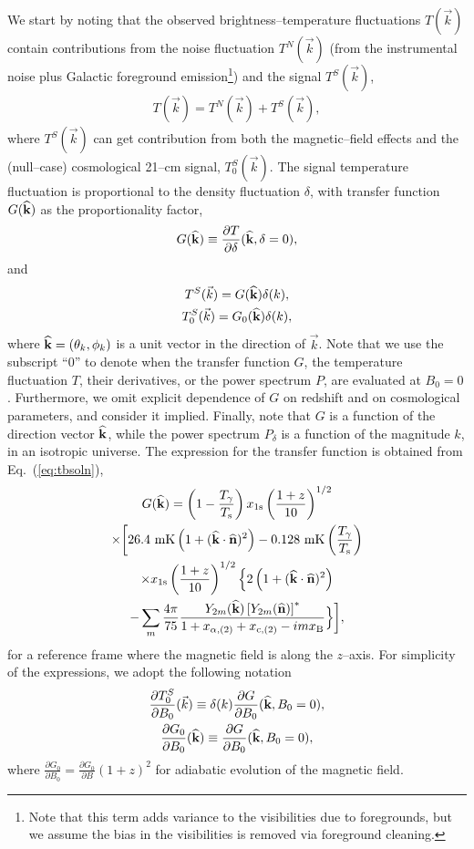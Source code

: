 \documentclass[aps,prd,twocolumn,floatfix,showpacs,superscriptaddress,nofootinbib]{revtex4-1}
\newcommand{\beq}{\begin{equation}}
\newcommand{\eeq}{\end{equation}}
\newcommand{\bga}{\begin{gathered}}
\newcommand{\ega}{\end{gathered}}
\begin{document}
We start by noting that the observed brightness--temperature fluctuations $T(\vec k)$ contain contributions from the noise fluctuation $T^N(\vec k)$ (from the instrumental noise plus Galactic foreground emission\footnote{Note that this term adds variance to the visibilities due to foregrounds, but we assume the bias in the visibilities is removed via foreground cleaning.}) and the signal $T^S(\vec k)$, 
\beq
\bga
T(\vec k) = T^N(\vec k) + T^S(\vec k),
\ega
\label{eq:Ttot}
\eeq
where $T^S(\vec k)$ can get contribution from both the magnetic--field effects and the (null--case) cosmological 21--cm signal, $T^S_0(\vec k)$. The signal temperature fluctuation is proportional to the density fluctuation $\delta$, with transfer function $G({\bf{\widehat k}})$ as the proportionality factor, 
\beq
\bga
G({\bf{\widehat k}}) \equiv \frac{\partial T}{\partial\delta}({\bf{\widehat k}},\delta=0),
\ega
\eeq
and
\beq
\bga
T^S(\vec k) = G({\bf{\widehat k}})\delta(k),\\
T^S_0(\vec k) = G_0({\bf{\widehat k}})\delta(k),
\ega
\label{eq:def_G}
\eeq
where ${\bf{\widehat k}}=(\theta_k,\phi_k)$ is a unit vector in the direction of $\vec k$. Note that we use the subscript ``0'' to denote when the transfer function $G$, the temperature fluctuation $T$, their derivatives, or the power spectrum $P$, are evaluated at $B_0=0$. Furthermore, we omit explicit dependence of $G$ on redshift and on cosmological parameters, and consider it implied. Finally, note that $G$ is a function of the direction vector ${\bf{\widehat k}}$, while the power spectrum $P_\delta$ is a function of the magnitude $k$, in an isotropic universe. The expression for the transfer function is obtained from Eq.~(\ref{eq:tbsoln}),
\beq
\bga
G({\bf{\widehat k}})=\left( 1 - \frac{T_\gamma}{T_{\rm s}} \right) x_{1{\rm s}} \left( \frac{1+z}{10} \right)^{1/2} \\
\times \biggl[ 26.4 \ {\rm mK}  \left(1 + ({\bf{\widehat k}} \cdot {\bf{\widehat n}})^2 \right)  
- 0.128 \ {\rm mK} \left( \frac{T_\gamma}{T_{\rm s}} \right)\\
\times x_{1{\rm s}} \left( \frac{1+z}{10} \right)^{1/2}  
 \Bigl\{ 2 \left(1 + ({\bf{\widehat k}} \cdot {\bf{\widehat n}})^2 \right) \\
- \sum_m \frac{4\pi}{75} \frac{Y_{2 m}({\bf{\widehat k}}) \left[ Y_{2 m} ({\bf{\widehat n}}) \right]^* }{1 + x_{ \alpha, (2) } + x_{{\rm c}, (2)} - i m x_{\rm B}} \Bigr\} \biggr] ,
\label{eq:G_def}
\ega
\eeq
for a reference frame where the magnetic field is along the $z$--axis.
For simplicity of the expressions, we adopt the following notation
\beq
\bga
\frac{\partial T_0^S}{\partial B_0}(\vec k)\equiv  \delta(k)\frac{\partial G}{\partial B_0}({\bf{\widehat k}},B_0=0),\\
\frac{\partial G_0}{\partial B_0}({\bf{\widehat k}})\equiv\frac{\partial G}{\partial B_0}({\bf{\widehat k}},B_0=0),
\ega
\label{eq:dTdB_dGdB}
\eeq
where $\frac{\partial G_0}{\partial B_0}=\frac{\partial G_0}{\partial B} (1+z)^2$ for adiabatic evolution of the magnetic field. 
\end{document}
